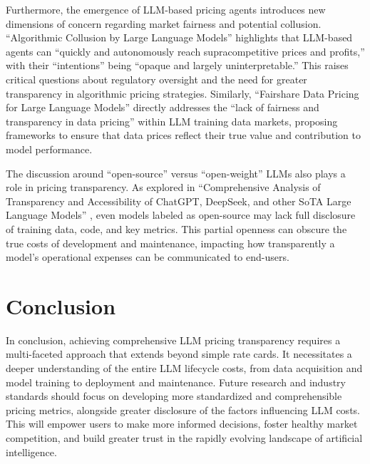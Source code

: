 Furthermore, the emergence of LLM-based pricing agents introduces new dimensions of concern regarding market fairness and potential collusion. ``Algorithmic Collusion by Large Language Models'' \cite{fish2025algorithmiccollusionlargelanguage} highlights that LLM-based agents can ``quickly and autonomously reach supracompetitive prices and profits,'' with their ``intentions'' being ``opaque and largely uninterpretable.'' This raises critical questions about regulatory oversight and the need for greater transparency in algorithmic pricing strategies. Similarly, ``Fairshare Data Pricing for Large Language Models'' \cite{zhang2025fairsharedatapricingdata}
directly addresses the ``lack of fairness and transparency in data pricing'' within LLM training data markets, proposing frameworks to ensure that data prices reflect their true value and contribution to model performance.

The discussion around ``open-source'' versus ``open-weight'' LLMs also plays a role in pricing transparency. As explored in ``Comprehensive Analysis of Transparency and Accessibility of ChatGPT, DeepSeek, and other SoTA Large Language Models'' \cite{sapkota2025comprehensiveanalysistransparencyaccessibility}, even models labeled as open-source may lack full disclosure of training data, code, and key metrics. This partial openness can obscure the true costs of development and maintenance, impacting how transparently a model's operational expenses can be communicated to end-users.



\section{Conclusion}
In conclusion, achieving comprehensive LLM pricing transparency requires a multi-faceted approach that extends beyond simple rate cards. It necessitates a deeper understanding of the entire LLM lifecycle costs, from data acquisition and model training to deployment and maintenance. Future research and industry standards should focus on developing more standardized and comprehensible pricing metrics, alongside greater disclosure of the factors influencing LLM costs. This will empower users to make more informed decisions, foster healthy market competition, and build greater trust in the rapidly evolving landscape of artificial intelligence.

\printbibliography

